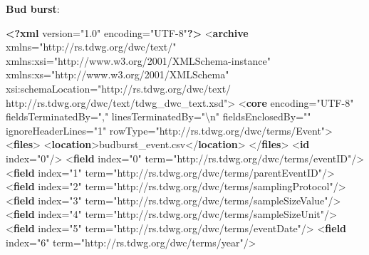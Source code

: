 \documentclass[
]{book}
\newenvironment{Shaded}{\begin{snugshade}}{\end{snugshade}}
\newcommand{\FunctionTok}[1]{\textcolor[rgb]{0.13,0.29,0.53}{\textbf{#1}}}
\newcommand{\KeywordTok}[1]{\textcolor[rgb]{0.13,0.29,0.53}{\textbf{#1}}}
\newcommand{\NormalTok}[1]{#1}
\newcommand{\OtherTok}[1]{\textcolor[rgb]{0.56,0.35,0.01}{#1}}
\newcommand{\StringTok}[1]{\textcolor[rgb]{0.31,0.60,0.02}{#1}}
\begin{document}
\textbf{Bud burst}:

\begin{Shaded}
\begin{Highlighting}[]
\FunctionTok{\textless{}?xml}\OtherTok{ version=}\StringTok{"1.0"}\OtherTok{ encoding=}\StringTok{"UTF{-}8"}\FunctionTok{?\textgreater{}}
\NormalTok{\textless{}}\KeywordTok{archive}\OtherTok{ xmlns=}\StringTok{"http://rs.tdwg.org/dwc/text/"}\OtherTok{ xmlns:xsi=}\StringTok{"http://www.w3.org/2001/XMLSchema{-}instance"}\OtherTok{ xmlns:xs=}\StringTok{"http://www.w3.org/2001/XMLSchema"}\OtherTok{ xsi:schemaLocation=}\StringTok{"http://rs.tdwg.org/dwc/text/ http://rs.tdwg.org/dwc/text/tdwg\_dwc\_text.xsd"}\NormalTok{\textgreater{}}
\NormalTok{  \textless{}}\KeywordTok{core}\OtherTok{ encoding=}\StringTok{"UTF{-}8"}\OtherTok{ fieldsTerminatedBy=}\StringTok{","}\OtherTok{ linesTerminatedBy=}\StringTok{"\textbackslash{}n"}\OtherTok{ fieldsEnclosedBy=}\StringTok{""}\OtherTok{ ignoreHeaderLines=}\StringTok{"1"}\OtherTok{ rowType=}\StringTok{"http://rs.tdwg.org/dwc/terms/Event"}\NormalTok{\textgreater{}}
\NormalTok{    \textless{}}\KeywordTok{files}\NormalTok{\textgreater{}}
\NormalTok{      \textless{}}\KeywordTok{location}\NormalTok{\textgreater{}budburst\_event.csv\textless{}/}\KeywordTok{location}\NormalTok{\textgreater{}}
\NormalTok{    \textless{}/}\KeywordTok{files}\NormalTok{\textgreater{}}
\NormalTok{    \textless{}}\KeywordTok{id}\OtherTok{ index=}\StringTok{"0"}\NormalTok{/\textgreater{}}
\NormalTok{    \textless{}}\KeywordTok{field}\OtherTok{ index=}\StringTok{"0"}\OtherTok{ term=}\StringTok{"http://rs.tdwg.org/dwc/terms/eventID"}\NormalTok{/\textgreater{}}
\NormalTok{    \textless{}}\KeywordTok{field}\OtherTok{ index=}\StringTok{"1"}\OtherTok{ term=}\StringTok{"http://rs.tdwg.org/dwc/terms/parentEventID"}\NormalTok{/\textgreater{}}
\NormalTok{    \textless{}}\KeywordTok{field}\OtherTok{ index=}\StringTok{"2"}\OtherTok{ term=}\StringTok{"http://rs.tdwg.org/dwc/terms/samplingProtocol"}\NormalTok{/\textgreater{}}
\NormalTok{    \textless{}}\KeywordTok{field}\OtherTok{ index=}\StringTok{"3"}\OtherTok{ term=}\StringTok{"http://rs.tdwg.org/dwc/terms/sampleSizeValue"}\NormalTok{/\textgreater{}}
\NormalTok{    \textless{}}\KeywordTok{field}\OtherTok{ index=}\StringTok{"4"}\OtherTok{ term=}\StringTok{"http://rs.tdwg.org/dwc/terms/sampleSizeUnit"}\NormalTok{/\textgreater{}}
\NormalTok{    \textless{}}\KeywordTok{field}\OtherTok{ index=}\StringTok{"5"}\OtherTok{ term=}\StringTok{"http://rs.tdwg.org/dwc/terms/eventDate"}\NormalTok{/\textgreater{}}
\NormalTok{    \textless{}}\KeywordTok{field}\OtherTok{ index=}\StringTok{"6"}\OtherTok{ term=}\StringTok{"http://rs.tdwg.org/dwc/terms/year"}\NormalTok{/\textgreater{}}

\end{Highlighting}
\end{Shaded}
\end{document}
